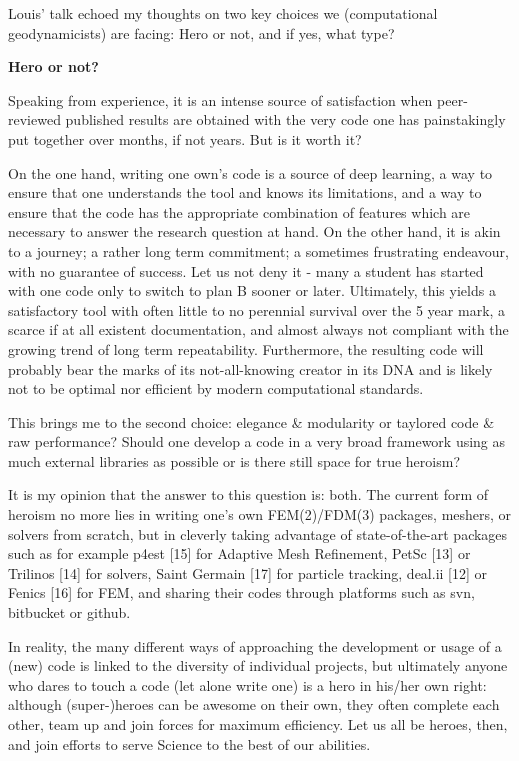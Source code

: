 Louis' talk echoed my thoughts on two key choices we (computational geodynamicists) are facing: Hero or not, and if yes, what type?

\vspace{3mm}

{\bf Hero or not?}

\vspace{3mm}

Speaking from experience, it is an intense source of satisfaction when peer-reviewed published results are obtained with the very code one has painstakingly put together over months, if not years. But is it worth it?

On the one hand, writing one own's code is a source of deep learning, a way to ensure that one understands the tool and knows its limitations, 
and a way to ensure that the code has the appropriate combination of features which are necessary to answer the research question at hand. 
On the other hand, it is akin to a journey; a rather long term commitment; a sometimes frustrating endeavour, with no guarantee of success. 
Let us not deny it - many a student has started with one code only to switch to plan B sooner or later. Ultimately, this yields a satisfactory 
tool with often little to no perennial survival over the 5 year mark, a scarce if at all existent documentation, and almost always not compliant with 
the growing trend of long term repeatability. Furthermore, the resulting code will probably bear the marks of its not-all-knowing creator in its 
DNA and is likely not to be optimal nor efficient by modern computational standards.

This brings me to the second choice: elegance \& modularity or taylored code \& raw performance? Should one develop a code in a very broad framework using as much external libraries as possible or is there still space for true heroism?

It is my opinion that the answer to this question is: both. The current form of heroism no more lies in writing one's own FEM(2)/FDM(3) packages, 
meshers, or solvers from scratch, but in cleverly taking advantage of state-of-the-art packages such as for example p4est [15] for Adaptive 
Mesh Refinement, PetSc [13] or Trilinos [14] for solvers, Saint Germain [17] for particle tracking, deal.ii [12] or Fenics [16] for FEM, 
and sharing their codes through platforms such as svn, bitbucket or github.

In reality, the many different ways of approaching the development or usage of a (new) code is linked to the diversity of individual projects, but ultimately anyone who dares to touch a code (let alone write one) is a hero in his/her own right: although (super-)heroes can be awesome on their own, they often complete each other, team up and join forces for maximum efficiency. Let us all be heroes, then, and join efforts to serve Science to the best of our abilities.

